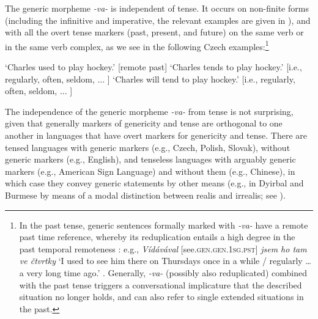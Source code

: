 \documentclass[output=paper,colorlinks,citecolor=brown]{langscibook}
\begin{document}
The generic morpheme \textit{-va-} is independent of tense. It occurs on non-finite forms 
(including the infinitive and imperative, the relevant examples are given in \citealt{filip1997suigenva}), and with all the 
overt tense markers (past, present, and future) on the same verb or in the same verb
complex, as we see in the following Czech examples:\footnote{In the past tense, generic sentences formally marked with \textit{-va-} 
have a remote past time reference, whereby its reduplication entails a high degree in the past temporal remoteness \citep{kucera1981aspect,kucera1983semantic,bily1986iterative}: e.g., \textit{Vídávával} [see.\textsc{gen.gen}.1\textsc{sg.pst}] 	\textit{jsem 	ho 	tam 	ve čtvrtky} `I used to see him there on Thursdays once in a while / regularly … a very long time ago.' \citep{chmelickova2005}. Generally, 
\textit{-va-} (possibly also reduplicated) combined with the past tense triggers a conversational implicature that the described situation no longer holds, and
can also refer to single extended situations in the past.}


\ea\label{va-tenses}
 
\glt `Charles used to play hockey.’ [remote past] 
 	
\glt `Charles tends to play hockey.’ [i.e., regularly, often, seldom,  ... ] 
   
\glt `Charles will tend to play hockey.’ [i.e., regularly, often, seldom,  ... ]
\z
\z

\noindent
The independence of the generic morpheme \textit{-va-} from tense is not surprising, given that generally
markers of genericity and tense are orthogonal to one another in languages that have overt markers for genericity and tense. 
There are tensed languages with generic markers (e.g., Czech, Polish, Slovak), without generic markers (e.g., English), and tenseless languages with arguably generic markers (e.g., American Sign Language) and without them (e.g., Chinese), in which case they convey generic statements by other means (e.g., in Dyirbal and Burmese by means of a modal distinction between realis and irrealis; see \citealt[51]{comrie1985tense}). 
\end{document}
